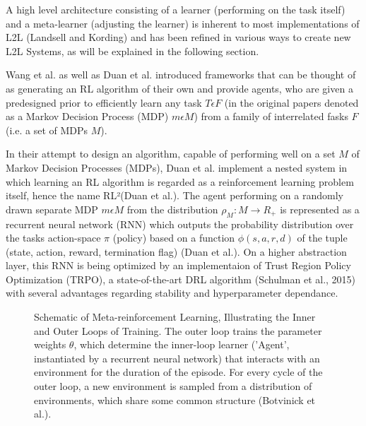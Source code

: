 \documentclass[letterpaper, 10 pt, conference]{ieeeconf}  %
\begin{document}
A high level architecture consisting of a learner (performing on the task itself) and a meta-learner (adjusting the learner) is
inherent to most implementations of L2L (Landsell and Kording) and has been refined in various ways to create new L2L Systems, as will be
explained in the following section.

Wang et al. as well as Duan et al. introduced frameworks that can be thought of as generating an RL algorithm of their own and
provide agents, who are given a predesigned prior to efficiently learn any task $T \epsilon F$ (in the original papers denoted as 
a Markov Decision Process (MDP) $m \epsilon M$) from a family of interrelated fasks $F$(i.e. a set of MDPs $M$). 

In their attempt to design an algorithm, capable of performing well on a set $M$ of Markov Decision Processes (MDPs), Duan et al. implement a nested
system in which learning an RL algorithm is regarded as a reinforcement learning problem itself, hence the name RL²(Duan et al.). The agent performing 
on a randomly drawn separate MDP $m \epsilon M$ from the distribution $\rho_{M} : M \longrightarrow R_{+}$ is represented as a recurrent neural
network (RNN) which outputs the probability distribution over the tasks action-space $\pi$ (policy) based on a function $\phi (s,a,r,d)$ of 
the tuple (state, action, reward, termination flag) (Duan et al.). On a higher abstraction layer, this RNN is being 
optimized by an implementaion of Trust Region Policy Optimization (TRPO), a 
state-of-the-art DRL algorithm (Schulman et al., 2015) with several advantages regarding stability and hyperparameter dependance.\newline

\begin{figure}[thpb]
        \centering
  \caption{Schematic of Meta-reinforcement Learning, Illustrating the Inner and Outer Loops of Training. The
  outer loop trains the parameter weights $\theta$, which determine the inner-loop learner (’Agent’, instantiated by a recurrent
  neural network) that interacts with an environment for the duration of the episode. For every cycle of the outer loop, a new
  environment is sampled from a distribution of environments, which share some common structure (Botvinick et al.).}
        \label{figurelabel}
     \end{figure}
\end{document}
